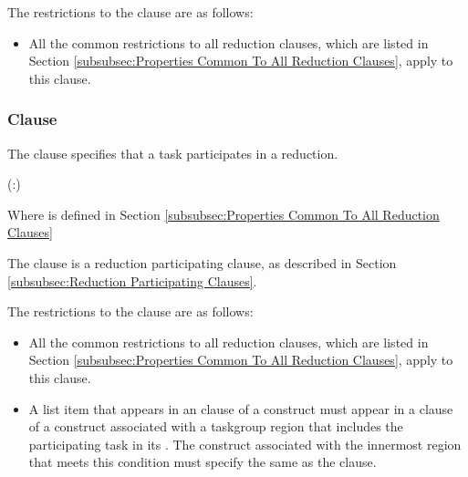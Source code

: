 {{{{\restrictions
The restrictions to the  clause are as follows:

\begin{itemize}
\item All the common restrictions to all reduction clauses, which are listed in
Section \ref{subsubsec:Properties Common To All Reduction Clauses}, apply to
this clause.
\end{itemize}










\subsubsection{ Clause}
\label{subsubsec:in_reduction clause}
\summary
The  clause specifies that a task participates in a reduction.

\syntax
\begin{boxedcode}
(:)
\end{boxedcode}
Where  is defined in Section \ref{subsubsec:Properties Common To All Reduction Clauses}

\descr
The  clause is a reduction participating clause, as described in
Section \ref{subsubsec:Reduction Participating Clauses}.

\restrictions
The restrictions to the  clause are as follows:

\begin{itemize}
\item All the common restrictions to all reduction clauses, which are listed in
Section \ref{subsubsec:Properties Common To All Reduction Clauses}, apply to
this clause.


\item A list item that appears in an  clause of a 
construct must appear in a  clause of a construct
associated with a taskgroup region that includes the participating task in its
. The construct associated with the innermost region that meets
this condition must specify the same  as the
 clause.
\end{itemize}










}}}}
